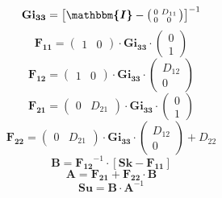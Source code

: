 \[ \mathbf{Gi_{33}} = \left[\boldsymbol{\mathbbm{I}}
-\left(\begin{smallmatrix} 0 & D_{11} \\ 0 & 0
\end{smallmatrix}\right)\right]^{-1} \]
\[ \mathbf{F_{11}} = \left(\begin{smallmatrix} 1 & 0
\end{smallmatrix}\right) \cdot\mathbf{Gi_{33}}\cdot
\left(\begin{smallmatrix} 0 \\ 1 \end{smallmatrix}\right) \]
\[ \mathbf{F_{12}} = \left(\begin{smallmatrix} 1 & 0
\end{smallmatrix}\right) \cdot\mathbf{Gi_{33}}\cdot
\left(\begin{smallmatrix} D_{12} \\ 0 \end{smallmatrix}\right) \]
\[ \mathbf{F_{21}} = \left(\begin{smallmatrix} 0 & D_{21}
\end{smallmatrix}\right) \cdot\mathbf{Gi_{33}}\cdot
\left(\begin{smallmatrix} 0 \\ 1 \end{smallmatrix}\right) \]
\[ \mathbf{F_{22}} = \left(\begin{smallmatrix} 0 & D_{21}
\end{smallmatrix}\right) \cdot\mathbf{Gi_{33}}\cdot
\left(\begin{smallmatrix} D_{12} \\ 0 \end{smallmatrix}\right) +
D_{22} \]
\[ \mathbf{B}=\mathbf{F_{12}}^{-1}\cdot\left[ \mathbf{Sk} -
\mathbf{F_{11}} \right]  \]
\[ \mathbf{A}=\mathbf{F_{21}}+ \mathbf{F_{22}}\cdot\mathbf{B} \]
\[ \mathbf{Su} = \mathbf{B} \cdot \mathbf{A}^{-1} \]
